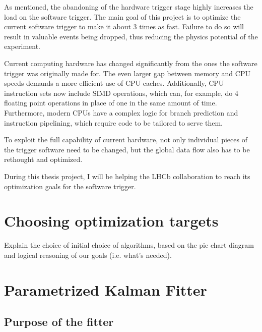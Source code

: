 \documentclass[12pt]{article}
\begin{document}
	As mentioned, the abandoning of the hardware trigger stage highly increases the load on the software trigger. The main goal of this project is to optimize the current software trigger to make it about 3 times as fast. Failure to do so will result in valuable events being dropped, thus reducing the physics potential of the experiment.
	
	Current computing hardware has changed significantly from the ones the software trigger was originally made for. The even larger gap between memory and CPU speeds demands a more efficient use of CPU caches. Additionally, CPU instruction sets now include SIMD operations, which can, for example, do 4 floating point operations in place of one in the same amount of time. Furthermore, modern CPUs have a complex logic for branch prediction and instruction pipelining, which require code to be tailored to serve them.

	To exploit the full capability of current hardware, not only individual pieces of the trigger software need to be changed, but the global data flow also has to be rethought and optimized.
	
	During this thesis project, I will be helping the LHCb collaboration to reach its optimization goals for the software trigger.
	
	\newpage
	\section{Choosing optimization targets}
	
	\color{red}
	Explain the choice of initial choice of algorithms, based on the pie chart diagram and logical reasoning of our goals (i.e. what's needed).	
	\color{black}
	
	\section{Parametrized Kalman Fitter}
	
	\subsection{Purpose of the fitter}
	
\end{document}

